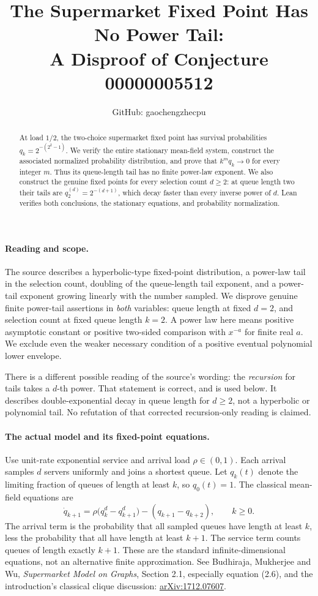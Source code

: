 \documentclass[11pt]{article}
\title{The Supermarket Fixed Point Has No Power Tail:\\A Disproof of Conjecture 00000005512}
\author{GitHub: gaochengzhecpu}
\date{}
\begin{document}
\maketitle
\begin{abstract}
At load $1/2$, the two-choice supermarket fixed point has survival
probabilities $q_k=2^{-(2^k-1)}$. We verify the entire stationary
mean-field system, construct the associated normalized probability
distribution, and prove that $k^m q_k\to0$ for every integer $m$.
Thus its queue-length tail has no finite power-law exponent. We also
construct the genuine fixed points for every selection count $d\ge2$:
at queue length two their tails are $q^{(d)}_2=2^{-(d+1)}$, which decay
faster than every inverse power of $d$. Lean verifies both conclusions,
the stationary equations, and probability normalization.
\end{abstract}

\paragraph{Reading and scope.}
The source describes a hyperbolic-type fixed-point distribution,
a power-law tail in the selection count, doubling of the queue-length
tail exponent, and a power-tail exponent growing linearly with the
number sampled. We disprove genuine finite power-tail assertions in
\emph{both} variables: queue length at fixed $d=2$, and selection
count at fixed queue length $k=2$. A power law here means positive
asymptotic constant or positive two-sided comparison with $x^{-a}$
for finite real $a$. We exclude even the weaker necessary condition
of a positive eventual polynomial lower envelope.

There is a different possible reading of the source's wording: the
\emph{recursion} for tails takes a $d$-th power. That statement is
correct, and is used below. It describes double-exponential decay in
queue length for $d\ge2$, not a hyperbolic or polynomial tail. No
refutation of that corrected recursion-only reading is claimed.

\paragraph{The actual model and its fixed-point equations.}
Use unit-rate exponential service and arrival load $\rho\in(0,1)$.
Each arrival samples $d$ servers uniformly and joins a shortest queue.
Let $q_k(t)$ denote the limiting fraction of queues of length at
least $k$, so $q_0(t)=1$. The classical mean-field equations are
\begin{equation}\label{eq:ode}
 \dot q_{k+1}
 =\rho\bigl(q_k^d-q_{k+1}^d\bigr)-(q_{k+1}-q_{k+2}),
 \qquad k\ge0.
\end{equation}
The arrival term is the probability that all sampled queues have
length at least $k$, less the probability that all have length at
least $k+1$. The service term counts queues of length exactly $k+1$.
These are the standard infinite-dimensional equations, not an
alternative finite approximation. See Budhiraja, Mukherjee and Wu,
\emph{Supermarket Model on Graphs}, Section 2.1, especially
equation (2.6), and the introduction's classical clique discussion:
\href{https://arxiv.org/abs/1712.07607}{arXiv:1712.07607}.
\end{document}
